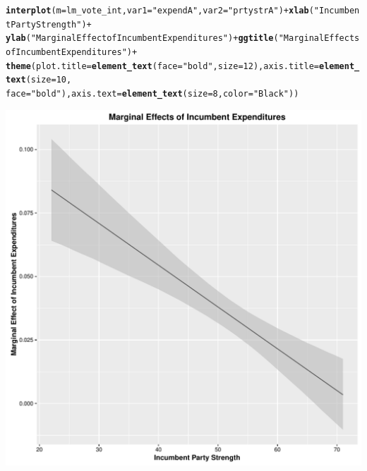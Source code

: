 \documentclass[12pt]{article}\usepackage[]{graphicx}\usepackage[]{color}
\makeatletter
\def\maxwidth{ %
  \ifdim\Gin@nat@width>\linewidth
    \linewidth
  \else
    \Gin@nat@width
  \fi
}
\newcommand{\hlnum}[1]{\textcolor[rgb]{0.686,0.059,0.569}{#1}}%
\newcommand{\hlstr}[1]{\textcolor[rgb]{0.192,0.494,0.8}{#1}}%
\newcommand{\hlopt}[1]{\textcolor[rgb]{0,0,0}{#1}}%
\newcommand{\hlstd}[1]{\textcolor[rgb]{0.345,0.345,0.345}{#1}}%
\newcommand{\hlkwc}[1]{\textcolor[rgb]{0.333,0.667,0.333}{#1}}%
\newcommand{\hlkwd}[1]{\textcolor[rgb]{0.737,0.353,0.396}{\textbf{#1}}}%
\newenvironment{kframe}{%
 \def\at@end@of@kframe{}%
 \ifinner\ifhmode%
  \def\at@end@of@kframe{\end{minipage}}%
  \begin{minipage}{\columnwidth}%
 \fi\fi%
 \def\FrameCommand##1{\hskip\@totalleftmargin \hskip-\fboxsep
 \colorbox{shadecolor}{##1}\hskip-\fboxsep
     \hskip-\linewidth \hskip-\@totalleftmargin \hskip\columnwidth}%
 \MakeFramed {\advance\hsize-\width
   \@totalleftmargin\z@ \linewidth\hsize
   \@setminipage}}%
 {\par\unskip\endMakeFramed%
 \at@end@of@kframe}
\newenvironment{knitrout}{}{} %
\makeatother
\begin{document}
\begin{knitrout}
\begin{kframe}
{\ttfamily\noindent\itshape\color{messagecolor}{\#\# Working directory is C:/Users/Jan/OneDrive/Documents/GitHub/ps630\_lab/ps630\_f16/W7}}\begin{alltt}
\hlkwd{interplot}\hlstd{(}\hlkwc{m} \hlstd{= lm_vote_int,} \hlkwc{var1} \hlstd{=} \hlstr{"expendA"}\hlstd{,} \hlkwc{var2} \hlstd{=} \hlstr{"prtystrA"}\hlstd{)} \hlopt{+} \hlkwd{xlab}\hlstd{(}\hlstr{"Incumbent Party Strength"}\hlstd{)} \hlopt{+}
    \hlkwd{ylab}\hlstd{(}\hlstr{"Marginal Effect of Incumbent Expenditures"}\hlstd{)} \hlopt{+} \hlkwd{ggtitle}\hlstd{(}\hlstr{"Marginal Effects of Incumbent Expenditures"}\hlstd{)} \hlopt{+}
    \hlkwd{theme}\hlstd{(}\hlkwc{plot.title} \hlstd{=} \hlkwd{element_text}\hlstd{(}\hlkwc{face} \hlstd{=} \hlstr{"bold"}\hlstd{,} \hlkwc{size} \hlstd{=} \hlnum{12}\hlstd{),} \hlkwc{axis.title} \hlstd{=} \hlkwd{element_text}\hlstd{(}\hlkwc{size} \hlstd{=} \hlnum{10}\hlstd{,}
        \hlkwc{face} \hlstd{=} \hlstr{"bold"}\hlstd{),} \hlkwc{axis.text} \hlstd{=} \hlkwd{element_text}\hlstd{(}\hlkwc{size} \hlstd{=} \hlnum{8}\hlstd{,} \hlkwc{color} \hlstd{=} \hlstr{"Black"}\hlstd{))}
\end{alltt}
\end{kframe}
\includegraphics[width=\maxwidth]{figure/unnamed-chunk-3-1} 
\begin{kframe}\begin{alltt}

\end{alltt}
\end{kframe}
\end{knitrout}
\end{document}
